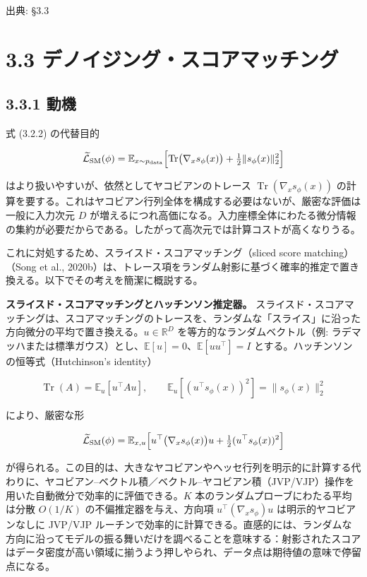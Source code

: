 

{\color{gray}\footnotesize 出典: §3.3\par}
\vspace{0.2em}
\section*{3.3 デノイジング・スコアマッチング}



\subsection*{3.3.1 動機}


式 (3.2.2) の代替目的

\[
\widetilde{\mathcal{L}}_{\mathrm{SM}}(\phi)
= \mathbb{E}_{x\sim p_{\mathrm{data}}}\Bigl[\operatorname{Tr}\bigl(\nabla_x s_\phi(x)\bigr) + \tfrac{1}{2}\|s_\phi(x)\|_2^2\Bigr]
\]


はより扱いやすいが、依然としてヤコビアンのトレース $\operatorname{Tr}(\nabla_x s_\phi(x))$ の計算を要する。これはヤコビアン行列全体を構成する必要はないが、厳密な評価は一般に入力次元 $D$ が増えるにつれ高価になる。入力座標全体にわたる微分情報の集約が必要だからである。したがって高次元では計算コストが高くなりうる。

これに対処するため、スライスド・スコアマッチング（sliced score matching）（Song et al., 2020b）は、トレース項をランダム射影に基づく確率的推定で置き換える。以下でその考えを簡潔に概説する。

\textbf{スライスド・スコアマッチングとハッチンソン推定器。} スライスド・スコアマッチングは、スコアマッチングのトレースを、ランダムな「スライス」に沿った方向微分の平均で置き換える。$u\in\mathbb{R}^D$ を等方的なランダムベクトル（例: ラデマッハまたは標準ガウス）とし、$\mathbb{E}[u]=0$、$\mathbb{E}[uu^\top]=I$ とする。ハッチンソンの恒等式（Hutchinson's identity）

\[
\operatorname{Tr}(A)=\mathbb{E}_u[u^\top A u],\qquad
\mathbb{E}_u[(u^\top s_\phi(x))^2]=\|s_\phi(x)\|_2^2
\]


により、厳密な形

\[
\widetilde{\mathcal{L}}_{\mathrm{SM}}(\phi)
= \mathbb{E}_{x,u}\Bigl[u^\top\bigl(\nabla_x s_\phi(x)\bigr)u + \tfrac{1}{2}(u^\top s_\phi(x))^2\Bigr]
\]


が得られる。この目的は、大きなヤコビアンやヘッセ行列を明示的に計算する代わりに、ヤコビアン–ベクトル積／ベクトル–ヤコビアン積（JVP/VJP）操作を用いた自動微分で効率的に評価できる。$K$ 本のランダムプローブにわたる平均は分散 $O(1/K)$ の不偏推定器を与え、方向項 $u^\top(\nabla_x s_\phi)u$ は明示的ヤコビアンなしに JVP/VJP ルーチンで効率的に計算できる。直感的には、ランダムな方向に沿ってモデルの振る舞いだけを調べることを意味する：射影されたスコアはデータ密度が高い領域に揃うよう押しやられ、データ点は期待値の意味で停留点になる。


